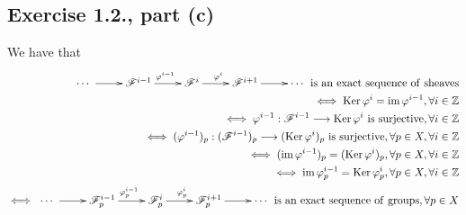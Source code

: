 \documentclass[11pt, a4paper, twoside]{article}
\begin{document}
\subsection{Exercise 1.2., part (c)}
	We have that 
	\begin{align*}
		\xymatrix{\cdots\ar[r]\ & \cF^{i-1} \ar[r]^{\phi^{i-1}} & \cF^{i} \ar[r]^{\phi^{i}} & \cF^{i+1} \ar[r] & \cdots}\ \mathrm{is\ an\ exact\ sequence\ of\ sheaves}\\ \iff \Ker\phi^{i}=\im\phi^{i-1},\forall i\in\Z\\
												   \iff \phi^{i-1}:\cF^{i-1}\ra\Ker\phi^{i}\ \mathrm{is\ surjective},\forall i\in\Z\\
												   \iff (\phi^{i-1})_p:(\cF^{i-1})_p\ra(\Ker\phi^{i})_p\ \mathrm{is\ surjective},\forall p\in X,\forall i\in\Z\\
												   \iff (\im\phi^{i-1})_p=(\Ker\phi^{i})_p,\forall p\in X,\forall i\in\Z\\
												   \iff \im\phi^{i-1}_p=\Ker\phi^{i}_p,\forall p\in X,\forall i\in\Z\\ 
												   \iff \xymatrix{\cdots\ar[r]\ & \cF^{i-1}_p \ar[r]^{\phi^{i-1}_p} & \cF^{i}_p \ar[r]^{\phi^{i}_p} & \cF^{i+1}_p \ar[r] & \cdots}\ \mathrm{is\ an\ exact\ sequence\ of\ groups},\forall p\in X
	\end{align*}
\end{document}
